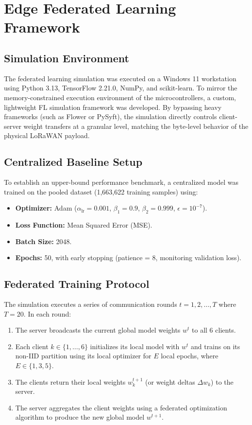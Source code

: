 \section{Edge Federated Learning Framework}
\label{sec:fl-framework}

\subsection{Simulation Environment}
The federated learning simulation was executed on a Windows 11 workstation using Python 3.13, TensorFlow 2.21.0, NumPy, and scikit-learn. To mirror the memory-constrained execution environment of the microcontrollers, a custom, lightweight FL simulation framework was developed. By bypassing heavy frameworks (such as Flower or PySyft), the simulation directly controls client-server weight transfers at a granular level, matching the byte-level behavior of the physical LoRaWAN payload.

\subsection{Centralized Baseline Setup}
To establish an upper-bound performance benchmark, a centralized model was trained on the pooled dataset (1,663,622 training samples) using:
\begin{itemize}
    \item \textbf{Optimizer:} Adam ($\alpha_{\text{lr}} = 0.001$, $\beta_1 = 0.9$, $\beta_2 = 0.999$, $\epsilon = 10^{-7}$).
    \item \textbf{Loss Function:} Mean Squared Error (MSE).
    \item \textbf{Batch Size:} 2048.
    \item \textbf{Epochs:} 50, with early stopping (patience = 8, monitoring validation loss).
\end{itemize}

\subsection{Federated Training Protocol}
The simulation executes a series of communication rounds $t = 1, 2, \dots, T$ where $T = 20$. In each round:
\begin{enumerate}
    \item The server broadcasts the current global model weights $w^t$ to all 6 clients.
    \item Each client $k \in \{1, \dots, 6\}$ initializes its local model with $w^t$ and trains on its non-IID partition using its local optimizer for $E$ local epochs, where $E \in \{1, 3, 5\}$.
    \item The clients return their local weights $w_k^{t+1}$ (or weight deltas $\Delta w_k$) to the server.
    \item The server aggregates the client weights using a federated optimization algorithm to produce the new global model $w^{t+1}$.
\end{enumerate}

